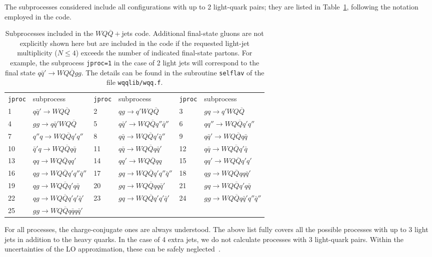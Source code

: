 \documentclass[paper]{JHEP3}
\newcommand{\ccaption}[2]{
    \begin{center}
    \parbox{0.85\textwidth}{
      \caption[#1]{\small{{#2}}}
      }
    \end{center}
    }
\def    \qbar   {\bar{q}}
\def    \Qbar   {\overline{Q}}
\begin{document}
 The subprocesses considered include all configurations
with up to 2 light-quark pairs; they are listed in
Table~\ref{tab:wqq}, following the notation employed in the
code. 
\begin{table}
\begin{center}
\begin{tabular}{ll|ll|ll}
{\tt jproc} & subprocess & {\tt jproc} & subprocess & {\tt jproc} &
subprocess \\ 
1 &  $q\qbar' \to W Q\Qbar$ 
&2 &  $q g \to q' W Q\Qbar$ 
&3 &  $g q \to q' W Q\Qbar$ 
\\
4 &  $gg \to q \qbar' W Q\Qbar$ 
&5 &  $q\qbar' \to W Q \Qbar q'' \qbar'' $ 
&6 &  $qq'' \to W Q \Qbar q' q'' $ 
\\
7 &  $q'' q \to W Q \Qbar q' q'' $ 
&8 &  $q\qbar \to W Q \Qbar q' \qbar'' $ 
&9 &  $q\qbar' \to W Q \Qbar q \qbar $ 
\\
10 &  $\qbar' q\to W Q \Qbar q \qbar $ 
&11 &  $q\qbar \to W Q \Qbar q \qbar' $ 
&12 &  $q\qbar \to W Q \Qbar q' \qbar $ 
\\
13 &  $q q \to W Q \Qbar q q' $ 
&14 &  $q q' \to W Q \Qbar q q $ 
&15 &  $q q' \to W Q \Qbar q' q' $ 
\\
16 &  $q g \to W Q \Qbar q' q''\qbar'' $ 
&17 &  $g q \to W Q \Qbar q' q''\qbar'' $ 
&18 &  $q g \to W Q \Qbar q q \qbar' $ 
\\
19 &  $q g \to W Q \Qbar q' q \qbar $ 
&20 &  $g q \to W Q \Qbar q q \qbar' $ 
&21 &  $g q \to W Q \Qbar q' q \qbar $ 
\\
22 &  $q g \to W Q \Qbar q' q' \qbar' $ 
&23 &  $g q \to W Q \Qbar q' q' \qbar' $ 
&24 &  $g g \to W Q \Qbar q \qbar' q'' \qbar'' $ 
\\
25 &  $g g \to W Q \Qbar q \qbar q \qbar' $ 
& &
& &
\end{tabular}
\ccaption{}{\label{tab:wqq} Subprocesses included in the $WQ\Qbar+$jets
  code. Additional final-state gluons are not explicitly 
  shown here but are included in the code if the requested light-jet
  multiplicity ($N\le 4$) exceeds the number of indicated final-state partons.
  For example, the subprocess {\tt jproc=1} in the case of 2 light jets
  will correspond to the final state  $q\qbar' \to W Q\Qbar g g$.
  The details can be found in the subroutine {\tt selflav} of
  the file {\tt wqqlib/wqq.f}.}
\end{center}
\end{table}
For all processes, the charge-conjugate ones are always understood.
The above list fully covers all the possible processes with up to 3
light jets in addition to the heavy quarks. In the case of 4 extra
jets, we do not calculate processes with 3 light-quark pairs. Within
the uncertainties of the LO approximation, these can be safely
neglected~\cite{Berends:1991ax}.
\end{document}
